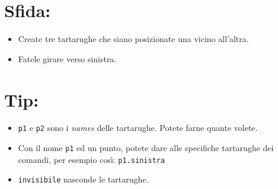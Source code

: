   
\section*{\color{BrickRed}Sfida:}


\begin{itemize}

\item {Create tre tartarughe che siano posizionate una vicino all'altra.}
\item {Fatele girare verso sinistra.}

\end{itemize}


\section*{\color{OliveGreen}Tip:}


\begin{itemize}

\item {\lstinline{p1} e \lstinline{p2} sono i {\it names} delle tartarughe. Potete farne quante volete.}
\item {Con il nome \lstinline{p1} ed un punto, potete dare alle specifiche tartarughe dei comandi, per esempio così: \lstinline{p1.sinistra}}
\item {\lstinline{invisibile} nasconde le tartarughe.}

\end{itemize}


